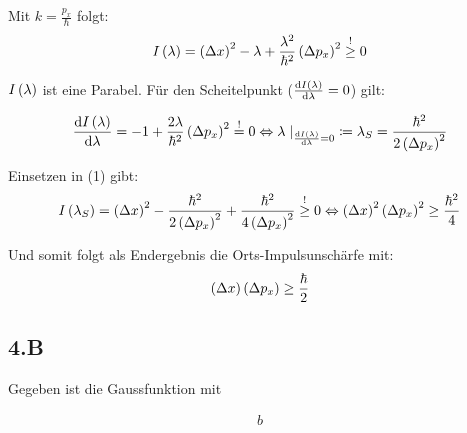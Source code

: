 \documentclass[11pt, ngerman, fleqn, DIV=15, headinclude]{scrartcl}
\begin{document}
Mit $k=\frac{p_x}{\hbar}$ folgt:
\begin{align}
	I\left( \lambda \right) = \left( \Delta x \right)^2 - \lambda + \frac{\lambda^2}{\hbar^2} \left( \Delta p_x \right)^2 \overset{!}{\geq} 0
\end{align}

$I\left( \lambda \right)$ ist eine Parabel. Für den Scheitelpunkt ($\frac{\mathop{}\!\mathrm d {I\left( \lambda \right)}}{\mathop{}\!\mathrm d {\lambda}} = 0$) gilt:

\begin{align*}
	\frac{\mathop{}\!\mathrm d {I\left( \lambda \right)}}{\mathop{}\!\mathrm d {\lambda}} = -1 + \frac{2\lambda}{\hbar^2}\left( \Delta p_x \right)^2\overset{!}{=}0 \Leftrightarrow \lambda\left.\right|_{\frac{\mathop{}\!\mathrm d {I\left( \lambda \right)}}{\mathop{}\!\mathrm d {\lambda}} = 0} \coloneqq \lambda_S = \frac{\hbar^2}{2\left( \Delta p_x \right)^2}
\end{align*}

Einsetzen in (1) gibt:
\begin{align*}
	I\left( \lambda_S \right) = \left( \Delta x \right)^2 - \frac{\hbar^2}{2\left( \Delta p_x \right)^2} + \frac{\hbar^2}{4\left( \Delta p_x \right)^2} \overset{!}{\geq} 0 \Leftrightarrow \left( \Delta x \right)^2\left( \Delta p_x \right)^2 \geq \frac{\hbar^2}4
\end{align*}

Und somit folgt als Endergebnis die Orts-Impulsunschärfe mit:
\begin{align*}
	\left( \Delta x \right)\left( \Delta p_x \right) \geq \frac{\hbar}2
\end{align*}



\subsection*{4.B}

Gegeben ist die Gaussfunktion mit

\begin{align*}
	b
\end{align*}
\end{document}
